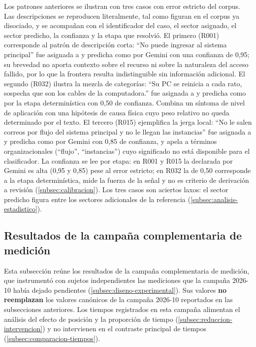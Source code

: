 Los patrones anteriores se ilustran con tres casos con error estricto del corpus. Las descripciones se reproducen literalmente, tal como figuran en el corpus ya disociado, y se acompañan con el identificador del caso, el sector asignado, el sector predicho, la confianza y la etapa que resolvió. El primero (R001) corresponde al patrón de descripción corta: ``No puede ingresar al sistema principal'' fue asignada a  y predicha como  por Gemini con una confianza de 0,95; su brevedad no aporta contexto sobre el recurso ni sobre la naturaleza del acceso fallido, por lo que la frontera resulta indistinguible sin información adicional. El segundo (R032) ilustra la mezcla de categorías: ``Su PC se reinicia a cada rato, sospecha que son los cables de la computadora.'' fue asignada a  y predicha como  por la etapa determinística con 0,50 de confianza. Combina un síntoma de nivel de aplicación con una hipótesis de causa física cuyo peso relativo no queda determinado por el texto. El tercero (R015) ejemplifica la jerga local: ``No le salen correos por flujo del sistema principal y no le llegan las instancias'' fue asignada a  y predicha como  por Gemini con 0,85 de confianza, y apela a términos organizacionales (``flujo'', ``instancias'') cuyo significado no está disponible para el clasificador. La confianza se lee por etapa: en R001 y R015 la declarada por Gemini es alta (0,95 y 0,85) pese al error estricto; en R032 la de 0,50 corresponde a la etapa determinística, mide la fuerza de la señal y no es criterio de derivación a revisión (\autoref{subsec:calibracion}). Los tres casos son aciertos laxos: el sector predicho figura entre los sectores adicionales de la referencia (\autoref{subsec:analisis-estadistico}).

\subsection{Resultados de la campaña complementaria de medición}\label{subsec:resultados-campana-medicion}

Esta subsección reúne los resultados de la campaña complementaria de medición, que instrumentó con sujetos independientes las mediciones que la campaña 2026-10 había dejado pendientes (\autoref{subsec:diseno-experimental}). Sus valores \textbf{no reemplazan} los valores canónicos de la campaña 2026-10 reportados en las subsecciones anteriores. Los tiempos registrados en esta campaña alimentan el análisis del efecto de posición y la proporción de tiempo (\autoref{subsec:reduccion-intervencion}) y no intervienen en el contraste principal de tiempos (\autoref{subsec:comparacion-tiempos}).

